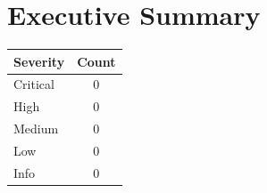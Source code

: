 \section{Executive Summary}

\begin{center}
\begin{tabular}{lc}
\toprule \textbf{Severity} & \textbf{Count}\\ \midrule
Critical & 0\\ High & 0\\ Medium & 0\\ Low & 0\\ Info & 0\\ \bottomrule
\end{tabular}
\end{center}
